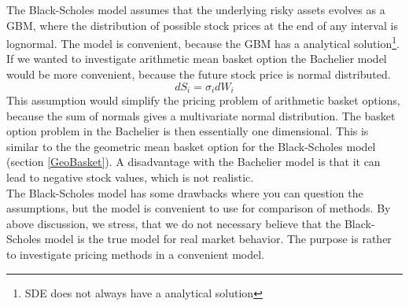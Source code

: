 The Black-Scholes model assumes that the underlying risky assets evolves as a GBM, where the distribution of possible stock prices at the end of any interval is lognormal. The model is convenient, because the GBM has a analytical solution\footnote{SDE does not always have a analytical solution}. If we wanted to investigate arithmetic mean basket option the Bachelier model would be more convenient, because the future stock price is normal distributed. 
\begin{equation*}
dS_i=\sigma_i dW_i
\end{equation*}
This assumption would simplify the pricing problem of arithmetic basket options, because the sum of normals gives a multivariate normal distribution. The basket option problem in the Bachelier is then essentially one dimensional. This is similar to the the geometric mean basket option for the Black-Scholes model (section \ref{GeoBasket}). A disadvantage with the Bachelier model is that it can lead to negative stock values, which is not realistic.\\

The Black-Scholes model has some drawbacks where you can question the assumptions, but the model is convenient to use for comparison of methods. By above discussion, we stress, that we do not necessary believe that the Black-Scholes model is the true model for real market behavior. The purpose is rather to investigate pricing methods in a convenient model.

